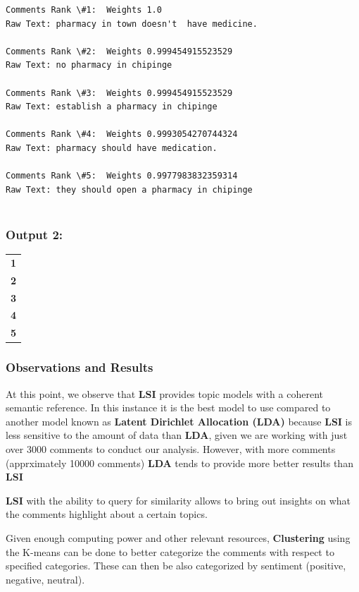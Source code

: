 \documentclass[11pt]{article}
\begin{document}
    \begin{Verbatim}[commandchars=\\\{\}]
Comments Rank \#1:	Weights 1.0
Raw Text: pharmacy in town doesn't  have medicine.

Comments Rank \#2:	Weights 0.999454915523529
Raw Text: no pharmacy in chipinge

Comments Rank \#3:	Weights 0.999454915523529
Raw Text: establish a pharmacy in chipinge

Comments Rank \#4:	Weights 0.9993054270744324
Raw Text: pharmacy should have medication.

Comments Rank \#5:	Weights 0.9977983832359314
Raw Text: they should open a pharmacy in chipinge 


    \end{Verbatim}

    \subsubsection{Output 2:}\label{output-2}

\begin{longtable}[]{@{}l@{}}
\toprule
\textbf{1}\tabularnewline
\textbf{2}\tabularnewline
\textbf{3}\tabularnewline
\textbf{4}\tabularnewline
\textbf{5}\tabularnewline
\bottomrule
\end{longtable}

    \subsubsection{Observations and Results}\label{observations-and-results}

At this point, we observe that \textbf{LSI} provides topic models with a
coherent semantic reference. In this instance it is the best model to
use compared to another model known as \textbf{Latent Dirichlet
Allocation (LDA)} because \textbf{LSI} is less sensitive to the amount
of data than \textbf{LDA}, given we are working with just over 3000
comments to conduct our analysis. However, with more comments
(apprximately 10000 comments) \textbf{LDA} tends to provide more better
results than \textbf{LSI}

\textbf{LSI} with the ability to query for similarity allows to bring
out insights on what the comments highlight about a certain topics.

Given enough computing power and other relevant resources,
\textbf{Clustering} using the K-means can be done to better categorize
the comments with respect to specified categories. These can then be
also categorized by sentiment (positive, negative, neutral).
\end{document}
